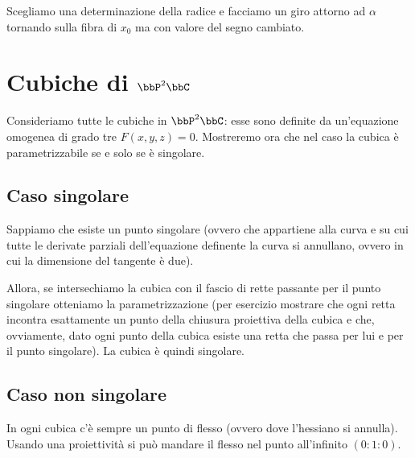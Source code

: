 Scegliamo una determinazione della radice e facciamo un giro attorno ad
$\alpha$ tornando sulla fibra di $x_0$ ma con valore del segno cambiato.


\section{Cubiche di $\bbP^2\bbC$}
Consideriamo tutte le cubiche in $\bbP^2\bbC$: esse sono definite da
un'equazione omogenea di grado tre $F(x, y, z) = 0$. Mostreremo ora che
nel caso la cubica è parametrizzabile se e solo se è singolare.


\subsection{Caso singolare}
Sappiamo che esiste un punto singolare (ovvero che appartiene alla curva
e su cui tutte le derivate parziali dell'equazione definente la curva si
annullano, ovvero in cui la dimensione del tangente è due).

Allora, se intersechiamo la cubica con il fascio di rette passante per
il punto singolare otteniamo la parametrizzazione (per esercizio
mostrare che ogni retta incontra esattamente un punto della chiusura
proiettiva della cubica e che, ovviamente, dato ogni punto della cubica
esiste una retta che passa per lui e per il punto singolare). La cubica
è quindi singolare.


\subsection{Caso non singolare}
In ogni cubica c'è sempre un punto di flesso (ovvero dove l'hessiano si
annulla). Usando una proiettività si può mandare il flesso nel punto
all'infinito $(0 : 1 : 0)$.

